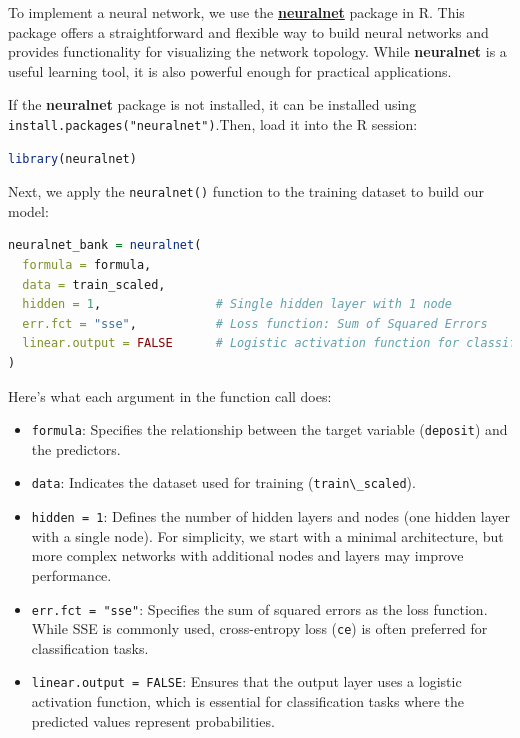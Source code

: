 \documentclass[
  11pt,
]{book}
\newcommand{\passthrough}[1]{#1}
\providecommand{\tightlist}{%
  \setlength{\itemsep}{0pt}\setlength{\parskip}{0pt}}
\theoremstyle{definition}
\theoremstyle{definition}
\theoremstyle{definition}
\theoremstyle{definition}
\theoremstyle{remark}
\begin{document}
To implement a neural network, we use the \href{https://CRAN.R-project.org/package=neuralnet}{\textbf{neuralnet}} package in R. This package offers a straightforward and flexible way to build neural networks and provides functionality for visualizing the network topology. While \textbf{neuralnet} is a useful learning tool, it is also powerful enough for practical applications.

If the \textbf{neuralnet} package is not installed, it can be installed using \passthrough{\lstinline!install.packages("neuralnet")!}.Then, load it into the R session:

\begin{lstlisting}[language=R]
library(neuralnet)
\end{lstlisting}

Next, we apply the \passthrough{\lstinline!neuralnet()!} function to the training dataset to build our model:

\begin{lstlisting}[language=R]
neuralnet_bank = neuralnet(
  formula = formula,
  data = train_scaled,
  hidden = 1,                # Single hidden layer with 1 node
  err.fct = "sse",           # Loss function: Sum of Squared Errors
  linear.output = FALSE      # Logistic activation function for classification
)
\end{lstlisting}

Here's what each argument in the function call does:

\begin{itemize}
\tightlist
\item
  \passthrough{\lstinline!formula!}: Specifies the relationship between the target variable (\passthrough{\lstinline!deposit!}) and the predictors.\\
\item
  \passthrough{\lstinline!data!}: Indicates the dataset used for training (\passthrough{\lstinline!train\_scaled!}).\\
\item
  \passthrough{\lstinline!hidden = 1!}: Defines the number of hidden layers and nodes (one hidden layer with a single node). For simplicity, we start with a minimal architecture, but more complex networks with additional nodes and layers may improve performance.\\
\item
  \passthrough{\lstinline!err.fct = "sse"!}: Specifies the sum of squared errors as the loss function. While SSE is commonly used, cross-entropy loss (\passthrough{\lstinline!ce!}) is often preferred for classification tasks.\\
\item
  \passthrough{\lstinline!linear.output = FALSE!}: Ensures that the output layer uses a logistic activation function, which is essential for classification tasks where the predicted values represent probabilities.
\end{itemize}
\end{document}
